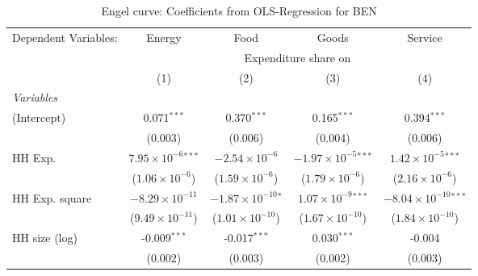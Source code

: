 
\begin{table}[htbp!]
   \centering
   \small
   \begin{adjustbox}{width = 1\textwidth, max height = 0.95\textheight, center}
      \begin{threeparttable}[b]
         \caption{\label{tab:Engel_parametric_BEN} Engel curve: Coefficients from OLS-Regression for BEN}
         \begin{tabular}{lcccc}
            \tabularnewline \midrule \midrule
            Dependent Variables: & Energy                        & Food                          & Goods                          & Service\\  
             & \multicolumn{4}{c}{Expenditure share on} \\ 
                                 & (1)                           & (2)                           & (3)                            & (4)\\  
            \midrule
            \emph{Variables}\\
            (Intercept)          & 0.071$^{***}$                 & 0.370$^{***}$                 & 0.165$^{***}$                  & 0.394$^{***}$\\   
                                 & (0.003)                       & (0.006)                       & (0.004)                        & (0.006)\\   
            HH Exp.              & $7.95\times 10^{-6}$$^{***}$  & $-2.54\times 10^{-6}$         & $-1.97\times 10^{-5}$$^{***}$  & $1.42\times 10^{-5}$$^{***}$\\    
                                 & ($1.06\times 10^{-6}$)        & ($1.59\times 10^{-6}$)        & ($1.79\times 10^{-6}$)         & ($2.16\times 10^{-6}$)\\    
            HH Exp. square       & $-8.29\times 10^{-11}$        & $-1.87\times 10^{-10}$$^{*}$  & $1.07\times 10^{-9}$$^{***}$   & $-8.04\times 10^{-10}$$^{***}$\\    
                                 & ($9.49\times 10^{-11}$)       & ($1.01\times 10^{-10}$)       & ($1.67\times 10^{-10}$)        & ($1.84\times 10^{-10}$)\\    
            HH size (log)        & -0.009$^{***}$                & -0.017$^{***}$                & 0.030$^{***}$                  & -0.004\\   
                                 & (0.002)                       & (0.003)                       & (0.002)                        & (0.003)\\   

\end{tabular}
\end{threeparttable}
\end{adjustbox}
\end{table}
